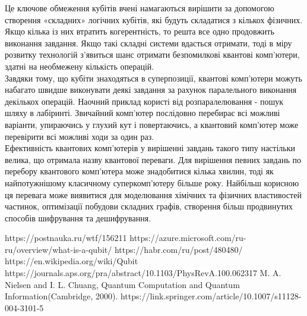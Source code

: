 \documentclass[a4paper,14pt]{extreport}
\begin{document}
Це ключове обмеження кубітів вчені намагаються вирішити за допомогою створення «складних» логічних кубітів, які будуть складатися з кількох фізичних. Якщо кілька із них втратить когерентність, то решта все одно продовжить виконання завдання. Якщо такі складні системи вдасться отримати, тоді в міру розвитку технологій з'явиться шанс отримати безпомилкові квантові комп'ютери, здатні на необмежену кількість операцій.\\ 
 
Завдяки тому, що кубіти знаходяться в суперпозиції, квантові комп'ютери можуть набагато швидше виконувати деякі завдання за рахунок паралельного виконання декількох операцій. Наочний приклад користі від розпаралелювання - пошук шляху в лабіринті. Звичайний комп'ютер послідовно перебирає всі можливі варіанти, упираючись у глухий кут і повертаючись, а квантовий комп'ютер може перевірити всі можливі ходи за один раз.\\ 

Ефективність квантових комп'ютерів у вирішенні завдань такого типу настільки велика, що отримала назву квантової переваги. Для вирішення певних завдань по перебору квантового комп'ютера може знадобитися кілька хвилин, тоді як найпотужнішому класичному суперкомп'ютеру більше року. Найбільш корисною ця перевага може виявитися для моделювання хімічних та фізичних властивостей частинок, оптимізації побудови складних графів, створення більш продвинутих способів шифрування та дешифрування.\\ 

\begin{thebibliography}{9}
 https://postnauka.ru/wtf/156211
 https://azure.microsoft.com/ru-ru/overview/what-is-a-qubit/
 https://habr.com/ru/post/480480/
 https://en.wikipedia.org/wiki/Qubit
 https://journals.aps.org/pra/abstract/10.1103/PhysRevA.100.062317
 M. A. Nielsen and I. L. Chuang, Quantum Computation and Quantum Information(Cambridge, 2000).
 https://link.springer.com/article/10.1007/s11128-004-3101-5

\end{thebibliography}
\end{document}
